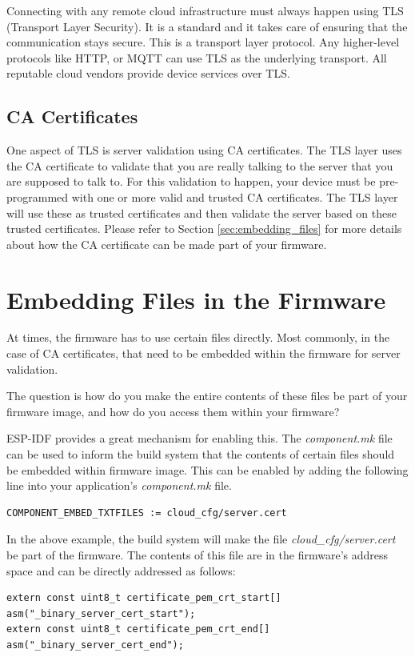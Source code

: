\documentclass[main.tex]{subfiles}
\begin{document}
Connecting with any remote cloud infrastructure must always happen using TLS (Transport Layer Security). It is a standard and it takes care of ensuring that the communication stays secure. This is a transport layer protocol. Any higher-level protocols like HTTP, or MQTT can use TLS as the underlying transport. All reputable cloud vendors provide device services over TLS.

\subsection{CA Certificates}
One aspect of TLS is server validation using CA certificates. The TLS layer uses the CA certificate to validate that you are really talking to the server that you are supposed to talk to. For this validation to happen, your device must be pre-programmed with one or more valid and trusted CA certificates. The TLS layer will use these as trusted certificates and then validate the server based on these trusted certificates. Please refer to Section \ref{sec:embedding_files} for more details about how the CA certificate can be made part of your firmware.

\section{Embedding Files in the Firmware}\label{sec:embedding_files}
At times, the firmware has to use certain files directly. Most commonly, in the case of CA certificates, that need to be embedded within the firmware for server validation.

The question is how do you make the entire contents of these files be part of your firmware image, and how do you access them within your firmware?

ESP-IDF provides a great mechanism for enabling this. The \textit{component.mk} file can be used to inform the build system that the contents of certain files should be embedded within firmware image. This can be enabled by adding the following line into your application's \textit{component.mk} file.

\begin{verbatim}
COMPONENT_EMBED_TXTFILES := cloud_cfg/server.cert 
\end{verbatim}

In the above example, the build system will make the file \textit{cloud_cfg/server.cert} be part of the firmware. The contents of this file are in the firmware's address space and can be directly addressed as follows:
\begin{verbatim}
extern const uint8_t certificate_pem_crt_start[] asm("_binary_server_cert_start");
extern const uint8_t certificate_pem_crt_end[] asm("_binary_server_cert_end");
\end{verbatim}
\end{document}
